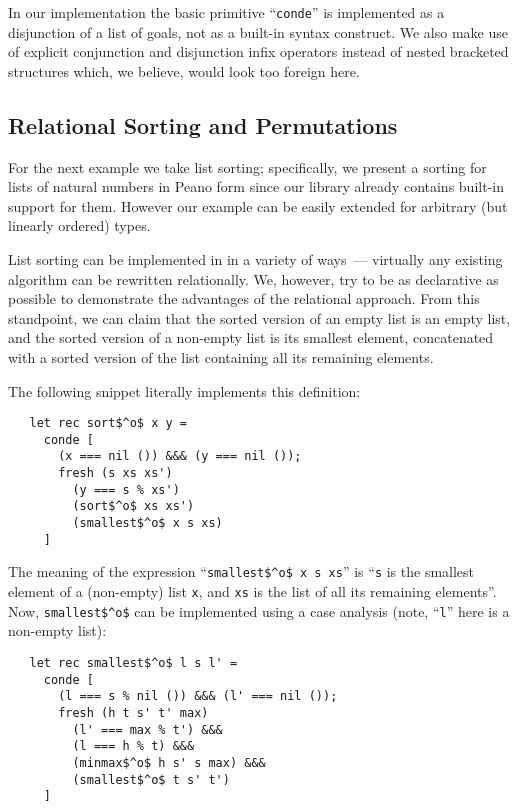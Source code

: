 In our implementation the basic \miniKanren primitive ``\lstinline{conde}'' is implemented as a
disjunction of a list of goals, not as a built-in syntax construct. We also make use of explicit
conjunction and disjunction infix operators instead of nested bracketed structures which, we
believe, would look too foreign here.

\subsection{Relational Sorting and Permutations}

For the next example we take list sorting; specifically, we present a sorting for lists of natural numbers
in Peano form since our library already contains built-in support for them. However our example can be
easily extended for arbitrary (but linearly ordered) types.

List sorting can be implemented in \miniKanren in a variety of ways~--- virtually any existing algorithm can
be rewritten relationally. We, however, try to be as declarative as possible to demonstrate the
advantages of the relational approach. From this standpoint, we can claim that the sorted version of an empty list is an
empty list, and the sorted version of a non-empty list is its smallest element, concatenated with a sorted
version of the list containing all its remaining elements.

The following snippet literally implements this definition:

\begin{lstlisting}
   let rec sort$^o$ x y =
     conde [
       (x === nil ()) &&& (y === nil ());
       fresh (s xs xs')
         (y === s % xs')
         (sort$^o$ xs xs')
         (smallest$^o$ x s xs)
     ]
\end{lstlisting}

The meaning of the expression ``\lstinline{smallest$^o$ x s xs}'' is ``\lstinline{s} is the smallest element of a (non-empty) list \lstinline{x}, and \lstinline{xs} is the
list of all its remaining elements''. Now, \lstinline{smallest$^o$} can be implemented using a case analysis (note, ``\lstinline{l}'' here is a non-empty list):

\begin{lstlisting}
   let rec smallest$^o$ l s l' =
     conde [
       (l === s % nil ()) &&& (l' === nil ());
       fresh (h t s' t' max)
         (l' === max % t') &&&
         (l === h % t) &&&
         (minmax$^o$ h s' s max) &&&
         (smallest$^o$ t s' t')
     ]
\end{lstlisting}

